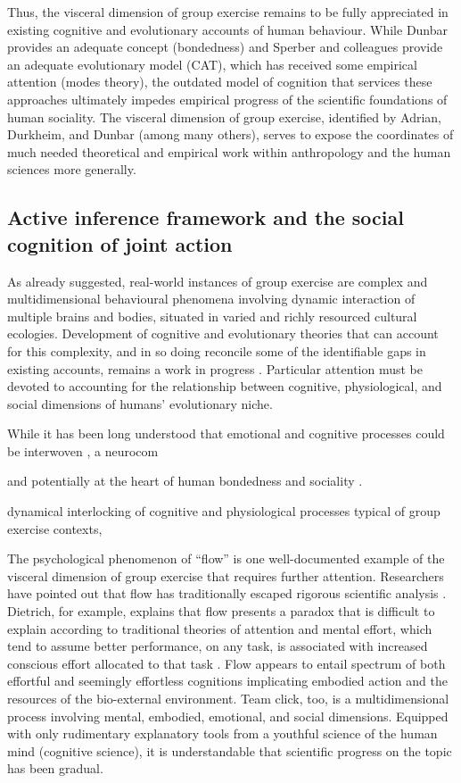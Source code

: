 \begin{CJK}{UTF8}{gbsn}
Thus, the visceral dimension of group exercise remains to be fully appreciated in existing cognitive and evolutionary accounts of human behaviour.  While Dunbar provides an adequate concept (bondedness) and Sperber and colleagues provide an adequate evolutionary model (CAT), which has received some empirical attention (modes theory), the outdated model of cognition that services these approaches ultimately impedes empirical progress of the scientific foundations of human sociality.  The visceral dimension of group exercise, identified by Adrian, Durkheim, and Dunbar (among many others), serves to expose the coordinates of much needed theoretical and empirical work within anthropology and the human sciences more generally.


\subsection{Active inference framework and the social cognition of joint action}

As already suggested, real-world instances of group exercise are complex and multidimensional behavioural phenomena involving dynamic interaction of multiple brains and bodies, situated in varied and richly resourced cultural ecologies.  Development of cognitive and evolutionary theories that can account for this complexity, and in so doing reconcile some of the identifiable gaps in existing accounts, remains a work in progress \citep{Fuentes2016}.  Particular attention must be devoted to accounting for the relationship between cognitive, physiological, and social dimensions of humans' evolutionary niche.


While it has been long understood that emotional and cognitive processes could be interwoven \citep[cf.][]{Damasio1994}, a neurocom

  and potentially at the heart of human bondedness and sociality \citep{Dunbar2010}.

dynamical interlocking of cognitive and physiological processes typical of group exercise contexts,




The psychological phenomenon of ``flow'' is one well-documented example of the visceral dimension of group exercise that requires further attention.  Researchers have pointed out that flow has traditionally escaped rigorous scientific analysis \citep{Dietrich2010a,Slingerland2014}. Dietrich, for example, explains that flow presents a paradox that is difficult to explain according to traditional theories of attention and mental effort, which tend to assume better performance, on any task, is associated with increased conscious effort allocated to that task \citep{Dietrich2004b}.  Flow appears to entail spectrum of both effortful and seemingly effortless cognitions implicating embodied action and the resources of the bio-external environment.  Team click, too, is a multidimensional process involving mental, embodied, emotional, and social dimensions.  Equipped with only rudimentary explanatory tools from a youthful science of the human mind (cognitive science), it is understandable that scientific progress on the topic has been gradual.


\end{CJK}
